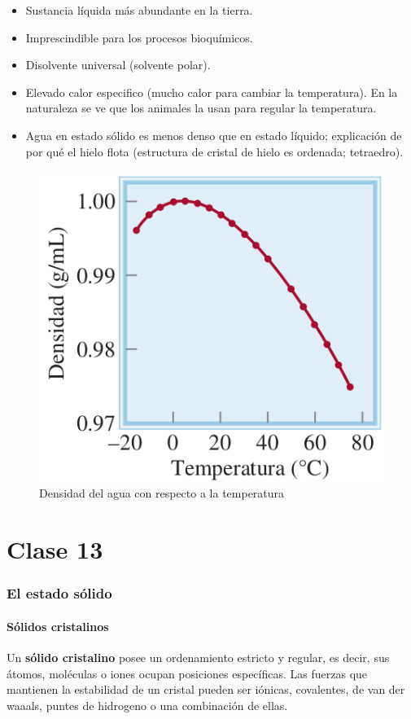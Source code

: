 \documentclass[]{article}
\begin{document}
\begin{itemize}
	\item Sustancia líquida más abundante en la tierra.
	\item Imprescindible para los procesos bioquímicos.
	\item Disolvente universal (solvente polar).
	\item Elevado calor especifico (mucho calor para cambiar la temperatura). En la naturaleza se ve que los animales la usan para regular la temperatura.
	\item Agua en estado sólido es menos denso que en estado líquido; explicación de por qué el hielo flota (estructura de cristal de hielo es ordenada; tetraedro).
\end{itemize}

\begin{figure}[H]
\center
\includegraphics[scale=0.38]{foto16.png}
\caption{Densidad del agua con respecto a la temperatura}
\end{figure}


\part{Clase 13}



\section{El estado sólido}



\subsection{Sólidos cristalinos}
Un \textbf{sólido cristalino} posee un ordenamiento estricto y regular, es decir, sus átomos, moléculas o iones ocupan posiciones específicas. Las fuerzas que mantienen la estabilidad de un cristal pueden ser iónicas, covalentes, de van der waaals, puntes de hidrogeno o una combinación de ellas.
\end{document}
